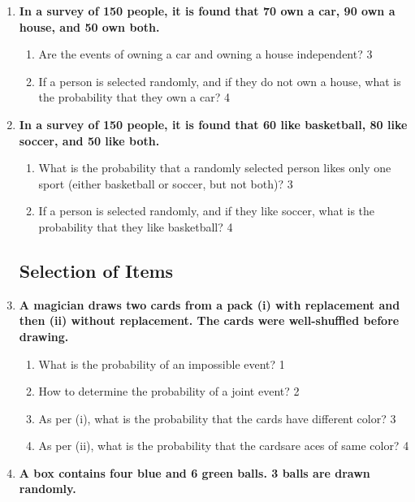 \documentclass[a4paper,oneside, margin=1.4in]{book}
\begin{document}
\begin{enumerate}
\item  
  \textbf{In a survey of 150 people, it is found that 70 own a car, 90 own a house, and 50 own both.}  

  \begin{enumerate}  
    \item  
    	Are the events of owning a car and owning a house independent?  \hfill 3  
    \item  
    	If a person is selected randomly, and if they do not own a house, what is the probability that they own a car? \hfill 4  
  \end{enumerate}  
  
  \item  
  \textbf{In a survey of 150 people, it is found that 60 like basketball, 80 like soccer, and 50 like both.}  

  \begin{enumerate}  
    \item  
    	What is the probability that a randomly selected person likes only one sport (either basketball or soccer, but not both)? \hfill 3  
    \item  
    	If a person is selected randomly, and if they like soccer, what is the probability that they like basketball? \hfill 4  
  \end{enumerate}  


\subsection{Selection of Items}

 \item
	  \textbf{A magician draws two cards from a pack (i) with replacement and then (ii) without replacement. The cards were well-shuffled before drawing.} 
  
  \begin{enumerate}
    \item
	What is the probability of an impossible event? \hfill 1
    \item
	How to determine the probability of a joint event?  \hfill 2
    \item  
	As per (i), what is the probability that the cards have different color? \hfill 3
    \item
	As per (ii), what is the probability that the cardsare aces of same color?  \hfill 4
  \end{enumerate}

 \item
	  \textbf{A box contains four blue and 6 green balls. 3 balls are drawn randomly.} 
  

\end{enumerate}
\end{document}
